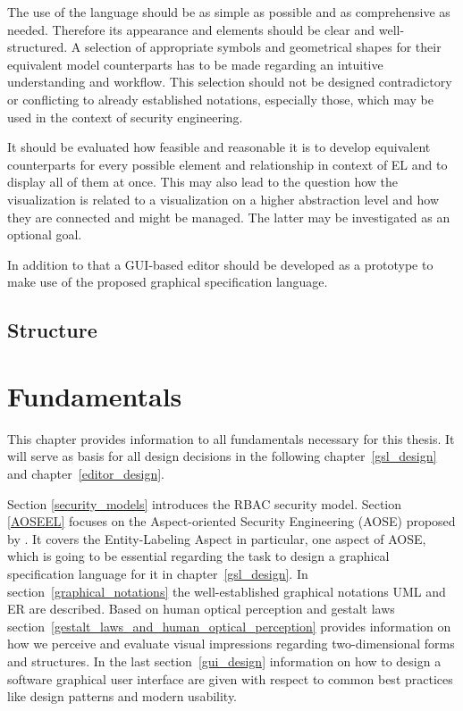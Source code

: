 \documentclass[twoside, openright, 12pt]{book}
\begin{document}
The use of the language should be as simple as possible and as comprehensive as needed.
Therefore its appearance and elements should be clear and well-structured.
A selection of appropriate symbols and geometrical shapes for their equivalent model counterparts has to be made regarding an intuitive understanding and workflow.
This selection should not be designed contradictory or conflicting to already established notations, especially those, which may be used in the context of security engineering.

It should be evaluated how feasible and reasonable it is to develop equivalent counterparts for every possible element and relationship in context of EL and to display all of them at once.
This may also lead to the question how the visualization is related to a visualization on a higher abstraction level and how they are connected and might be managed.
The latter may be investigated as an optional goal.

In addition to that a GUI-based editor should be developed as a prototype to make use of the proposed graphical specification language.



\section{Structure}
\label{structure}




\cleardoublepage
\chapter{Fundamentals}
\label{fundamentals}
This chapter provides information to all fundamentals necessary for this thesis.
It will serve as basis for all design decisions in the following chapter~\ref{gsl_design} and chapter~\ref{editor_design}.

Section \ref{security_models} introduces the RBAC security model.
Section \ref{AOSEEL} focuses on the Aspect-oriented Security Engineering (AOSE) proposed by \citet*{Amthor18}.
It covers the Entity-Labeling Aspect in particular, one aspect of AOSE, which is going to be essential regarding the task to design a graphical specification language for it in chapter~\ref{gsl_design}.
In section~\ref{graphical_notations} the well-established graphical notations UML and ER are described.
Based on human optical perception and gestalt laws section~\ref{gestalt_laws_and_human_optical_perception} provides information on how we perceive and evaluate visual impressions regarding two-dimensional forms and structures.
In the last section~\ref{gui_design} information on how to design a software graphical user interface are given with respect to common best practices like design patterns and modern usability.
\end{document}
